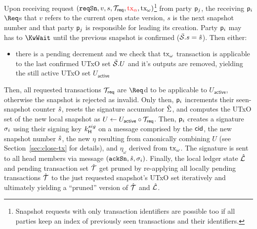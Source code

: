 \quad Upon receiving request
$(\mathtt{reqSn},v,s,{\mathcal T}_{\mathsf{req}}, \textcolor{red}{\mathrm{tx}_\alpha}, \mathrm{tx}_\omega)$\footnote{Snapshot requests
	with only transaction identifiers are possible too if all parties keep an
	index of previously seen transactions and their identifiers.} from party
$\mathsf p_j$, the receiving $\mathsf p_i$ $\Req$s that $v$ refers to the current
open state version, $s$ is the next snapshot number
and that party $\mathsf p_j$ is responsible for leading its creation. Party $\mathsf p_i$ may has to $\KwWait$ until the previous snapshot is
  confirmed ($\bar{\mathcal S}.s = \hat s$). Then either:
\begin{itemize}
  \item
    there is a pending decrement and we check that $\mathrm{tx}_\omega$ transaction is applicable to the last confirmed
	  UTxO set $\bar{\mathcal S}.U$ and it's outputs are removed, yielding the still active UTxO set $U_{\mathsf{active}}$
\end{itemize}
  Then, all requested transactions ${\mathcal T}_{\mathsf{req}}$ are $\Req$d to be applicable
  to $U_{\mathsf{active}}$,
  otherwise the snapshot is rejected as invalid. Only then, $\mathsf p_i$ increments
  their seen-snapshot counter $\hat s$, resets the signature accumulator
  $\hat{\Sigma}$, and computes the UTxO set of the new local snapshot as
  $U \gets U_{\mathsf{active}} \circ {\mathcal T}_{\mathsf{req}}$. Then, $\mathsf p_i$
  creates a signature $\sigma_i$ using their signing key $k^{sig}_\mathsf{H}$ on a
  message comprised by the $\mathsf{cid}$, the new snapshot number $\hat s$, the new $\eta$
  resulting from canonically combining $U$ (see Section~\ref{sec:close-tx} for
  details),  and $\eta_\omega$ derived from $\mathrm{tx}_\omega$.
  The signature is sent to all head members via message $(\mathtt{ackSn},\hat s,\sigma_i)$.
  Finally, the local ledger state $\hat {\mathcal L}$ and pending transaction set $\hat {\mathcal T}$
  get pruned by re-applying all locally pending transactions $\hat {\mathcal T}$ to the just
  requested snapshot's UTxO set iteratively and
  ultimately yielding a ``pruned'' version of $\hat {\mathcal T}$ and $\hat {\mathcal L}$. \\

